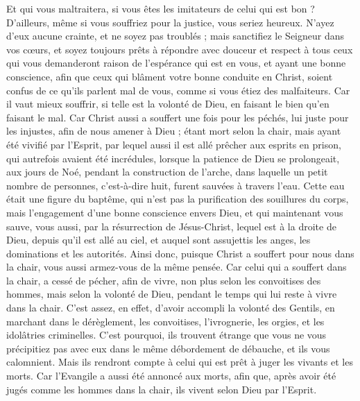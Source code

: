 \begin{multicols}{2}
Et qui vous maltraitera, si vous êtes les imitateurs de celui qui est bon ?
D’ailleurs, même si vous souffriez pour la justice, vous seriez heureux. N’ayez d’eux aucune crainte, et ne soyez pas troublés ;
mais sanctifiez le Seigneur dans vos cœurs, et soyez toujours prêts à répondre avec douceur et respect à tous ceux qui vous demanderont raison de l'espérance qui est en vous,
et ayant une bonne conscience, afin que ceux qui blâment votre bonne conduite en Christ, soient confus de ce qu'ils parlent mal de vous, comme si vous étiez des malfaiteurs.
Car il vaut mieux souffrir, si telle est la volonté de Dieu, en faisant le bien qu’en faisant le mal.
Car Christ aussi a souffert une fois pour les péchés, lui juste pour les injustes, afin de nous amener à Dieu ; étant mort selon la chair, mais ayant été vivifié par l'Esprit,
par lequel aussi il est allé prêcher aux esprits en prison,
qui autrefois avaient été incrédules, lorsque la patience de Dieu se prolongeait, aux jours de Noé, pendant la construction de l'arche, dans laquelle un petit nombre de personnes, c’est-à-dire huit, furent sauvées à travers l'eau.
Cette eau était une figure du baptême, qui n’est pas la purification des souillures du corps, mais l’engagement d’une bonne conscience envers Dieu, et qui maintenant vous sauve, vous aussi, par la résurrection de Jésus-Christ,
lequel est à la droite de Dieu, depuis qu’il est allé au ciel, et auquel sont assujettis les anges, les dominations et les autorités.
\VerseOne{}Ainsi donc, puisque Christ a souffert pour nous dans la chair, vous aussi armez-vous de la même pensée. Car celui qui a souffert dans la chair, a cessé de pécher,
afin de vivre, non plus selon les convoitises des hommes, mais selon la volonté de Dieu, pendant le temps qui lui reste à vivre dans la chair.
C’est assez, en effet, d’avoir accompli la volonté des Gentils, en marchant dans le dérèglement, les convoitises, l’ivrognerie, les orgies, et les idolâtries criminelles.
C’est pourquoi, ils trouvent étrange que vous ne vous précipitiez pas avec eux dans le même débordement de débauche, et ils vous calomnient.
Mais ils rendront compte à celui qui est prêt à juger les vivants et les morts.
Car l'Evangile a aussi été annoncé aux morts, afin que, après avoir été jugés comme les hommes dans la chair, ils vivent selon Dieu par l'Esprit.

\end{multicols}

